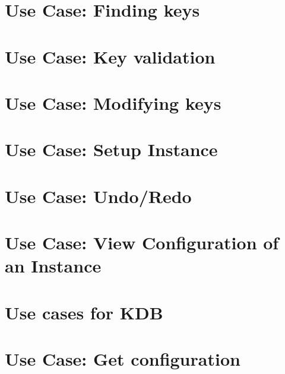 \let\mypdfximage\pdfximage\def\pdfximage{\immediate\mypdfximage}\documentclass[twoside]{book}
\newcommand{\+}{\discretionary{\mbox{\scriptsize$\hookleftarrow$}}{}{}}
\begin{document}
\chapter{Use Case\+: Finding keys}
\label{doc_usecases_elektra_web_UC_finding_keys_md}

\chapter{Use Case\+: Key validation}
\label{doc_usecases_elektra_web_UC_key_validation_md}

\chapter{Use Case\+: Modifying keys}
\label{doc_usecases_elektra_web_UC_modifying_keys_md}

\chapter{Use Case\+: Setup Instance}
\label{doc_usecases_elektra_web_UC_setup_instance_md}

\chapter{Use Case\+: Undo/\+Redo}
\label{doc_usecases_elektra_web_UC_undo_redo_md}

\chapter{Use Case\+: View Configuration of an Instance}
\label{doc_usecases_elektra_web_UC_view_config_md}

\chapter{Use cases for KDB}
\label{doc_usecases_kdb_README_md}

\chapter{Use Case\+: Get configuration}
\label{doc_usecases_kdb_UC_get_config_md}

\end{document}

